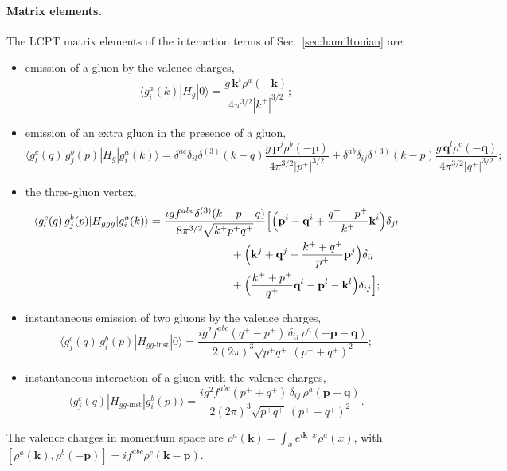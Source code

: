 \paragraph*{Matrix elements.} The LCPT matrix elements of the interaction terms of Sec.~\ref{sec:hamiltonian} are:
\begin{itemize}
\item emission of a gluon by the valence charges,
\begin{equation}
\langle g^a_i(k)|H_g|0\rangle=\frac{g\,\mathbf k^i\rho^a(-\mathbf k)}{4\pi^{3/2}|k^+|^{3/2}};
\label{eq:m1}
\end{equation}
\item emission of an extra gluon in the presence of a gluon,
\begin{equation}
\langle g^c_l(q)\,g^b_j(p)|H_g|g^a_i(k)\rangle=\delta^{ac}\delta_{il}\delta^{(3)}(k-q)\frac{g\,\mathbf p^j\rho^b(-\mathbf p)}{4\pi^{3/2}|p^+|^{3/2}}+\delta^{ab}\delta_{ij}\delta^{(3)}(k-p)\frac{g\,\mathbf q^l\rho^c(-\mathbf q)}{4\pi^{3/2}|q^+|^{3/2}};
\label{eq:m2}
\end{equation}
\item the three-gluon vertex,
\begin{align}
\langle g^c_l(q)\,g^b_j(p)|H_{ggg}|g^a_i(k)\rangle={}&\frac{igf^{abc}\delta^{(3)}(k-p-q)}{8\pi^{3/2}\sqrt{k^+p^+q^+}}\Big[\Big(\mathbf p^i-\mathbf q^i+\frac{q^+-p^+}{k^+}\mathbf k^i\Big)\delta_{jl}\notag\\
&\hspace{6em}+\Big(\mathbf k^j+\mathbf q^j-\frac{k^++q^+}{p^+}\mathbf p^j\Big)\delta_{il}\notag\\
&\hspace{6em}+\Big(\frac{k^++p^+}{q^+}\mathbf q^l-\mathbf p^l-\mathbf k^l\Big)\delta_{ij}\Big];
\label{eq:m3}
\end{align}
\item instantaneous emission of two gluons by the valence charges,
\begin{equation}
\langle g^c_j(q)\,g^b_i(p)|H_{gg\text{-inst}}|0\rangle=\frac{ig^2f^{abc}(q^+-p^+)\,\delta_{ij}\,\rho^a(-\mathbf p-\mathbf q)}{2(2\pi)^3\sqrt{p^+q^+}\,(p^++q^+)^2};
\label{eq:m4}
\end{equation}
\item instantaneous interaction of a gluon with the valence charges,
\begin{equation}
\langle g^c_j(q)|H_{gg\text{-inst}}|g^b_i(p)\rangle=\frac{ig^2f^{abc}(p^++q^+)\,\delta_{ij}\,\rho^a(\mathbf p-\mathbf q)}{2(2\pi)^3\sqrt{p^+q^+}\,(p^+-q^+)^2}.
\label{eq:m5}
\end{equation}
\end{itemize}
The valence charges in momentum space are $\rho^a(\mathbf k)=\int_xe^{i\mathbf k\cdot x}\rho^a(x)$, with $[\rho^a(\mathbf k),\rho^b(-\mathbf p)]=if^{abc}\rho^c(\mathbf k-\mathbf p)$.

